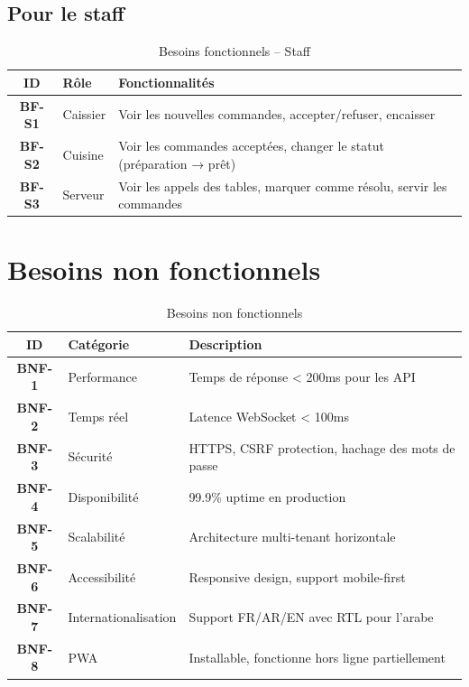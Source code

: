 \documentclass[12pt,a4paper]{report}
\begin{document}
\subsection{Pour le staff}

\begin{table}[H]
    \centering
    \caption{Besoins fonctionnels -- Staff}
    \label{tab:bf-staff}
    \begin{tabularx}{\textwidth}{>{\bfseries}cp{}p{}}
        \toprule
        \textbf{ID} & \textbf{Rôle} & \textbf{Fonctionnalités} \\
        \midrule
        BF-S1 & Caissier & Voir les nouvelles commandes, accepter/refuser, encaisser \\
        BF-S2 & Cuisine & Voir les commandes acceptées, changer le statut (préparation → prêt) \\
        BF-S3 & Serveur & Voir les appels des tables, marquer comme résolu, servir les commandes \\
        \bottomrule
    \end{tabularx}
\end{table}

\section{Besoins non fonctionnels}

\begin{table}[H]
    \centering
    \caption{Besoins non fonctionnels}
    \label{tab:bnf}
    \begin{tabularx}{\textwidth}{>{\bfseries}cp{}p{}}
        \toprule
        \textbf{ID} & \textbf{Catégorie} & \textbf{Description} \\
        \midrule
        BNF-1 & Performance & Temps de réponse < 200ms pour les API \\
        BNF-2 & Temps réel & Latence WebSocket < 100ms \\
        BNF-3 & Sécurité & HTTPS, CSRF protection, hachage des mots de passe \\
        BNF-4 & Disponibilité & 99.9\% uptime en production \\
        BNF-5 & Scalabilité & Architecture multi-tenant horizontale \\
        BNF-6 & Accessibilité & Responsive design, support mobile-first \\
        BNF-7 & Internationalisation & Support FR/AR/EN avec RTL pour l'arabe \\
        BNF-8 & PWA & Installable, fonctionne hors ligne partiellement \\
        \bottomrule
    \end{tabularx}
\end{table}
\end{document}
